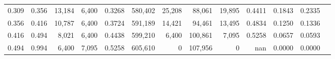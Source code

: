 \begin{tabular}{rrrrrrrrrrrrr}
0.309 & 0.356 &  13,184 & 6,400 &                                     0.3268 & 580,402 &  25,208 &  88,061 &  19,895 & 0.4411 & 0.1843 & 0.2335 \\
0.356 & 0.416 &  10,787 & 6,400 &                                     0.3724 & 591,189 &  14,421 &  94,461 &  13,495 & 0.4834 & 0.1250 & 0.1336 \\
0.416 & 0.494 &   8,021 & 6,400 &                                     0.4438 & 599,210 &   6,400 & 100,861 &   7,095 & 0.5258 & 0.0657 & 0.0593 \\
0.494 & 0.994 &   6,400 & 7,095 &                                     0.5258 & 605,610 &       0 & 107,956 &       0 &    nan & 0.0000 & 0.0000 \\
\bottomrule
\end{tabular}
